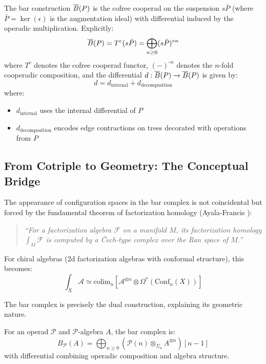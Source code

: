\begin{definition}
The bar construction $\overline{B}(P)$ is the cofree cooperad on the suspension $s\bar{P}$ (where $\bar{P} = \ker(\epsilon)$ is the augmentation ideal) with differential induced by the operadic multiplication. Explicitly:
\[
\overline{B}(P) = T^c(s\bar{P}) = \bigoplus_{n \geq 0} (s\bar{P})^{\circ n}
\]
where $T^c$ denotes the cofree cooperad functor, $(-)^{\circ n}$ denotes the $n$-fold cooperadic composition,
and the differential $d: \overline{B}(P) \to \overline{B}(P)$ is given by:
\[
d = d_{\text{internal}} + d_{\text{decomposition}}
\]
where:
\begin{itemize}
\item $d_{\text{internal}}$ uses the internal differential of $P$
\item $d_{\text{decomposition}}$ encodes edge contractions on trees decorated with operations from $P$
\end{itemize}
\end{definition}

\subsection{From Cotriple to Geometry: The Conceptual Bridge}

\begin{remark}
The appearance of configuration spaces in the bar complex is not coincidental but forced by the 
fundamental theorem of factorization homology (Ayala-Francis \cite{AF}):

\begin{quote}
\emph{``For a factorization algebra $\mathcal{F}$ on a manifold $M$, its factorization homology 
$\int_M \mathcal{F}$ is computed by a Čech-type complex over the Ran space of $M$.''}
\end{quote}

For chiral algebras (2d factorization algebras with conformal structure), this becomes:
$$\int_X \mathcal{A} \simeq \text{colim}_{n} \left[ \mathcal{A}^{\otimes n} \otimes \Omega^*(\text{Conf}_n(X)) \right]$$

The bar complex is precisely the dual construction, explaining its geometric nature.
\end{remark}

\begin{theorem}\label{thm:operadic-bar}
For an operad $\mathcal{P}$ and $\mathcal{P}$-algebra $A$, the bar complex is:
$$B_{\mathcal{P}}(A) = \bigoplus_{n \geq 0} (\mathcal{P}(n) \otimes_{\Sigma_n} A^{\otimes n})[n-1]$$
with differential combining operadic composition and algebra structure.
\end{theorem}

